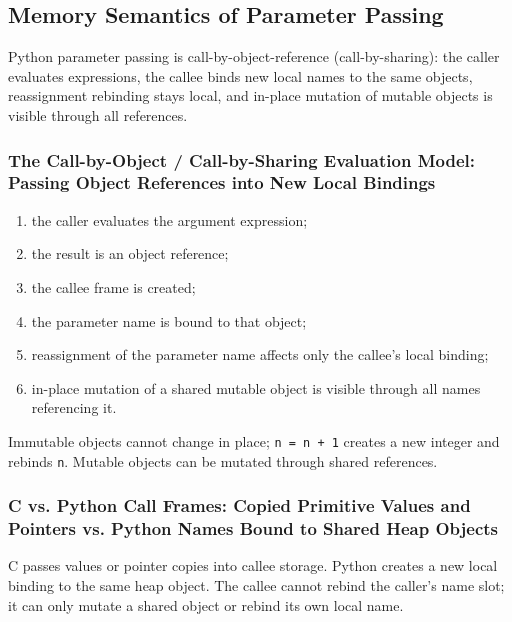 \subsection{Memory Semantics of Parameter Passing}

Python parameter passing is call-by-object-reference (call-by-sharing): the caller evaluates expressions, the callee binds new local names to the same objects, reassignment rebinding stays local, and in-place mutation of mutable objects is visible through all references.

\subsubsection{The Call-by-Object / Call-by-Sharing Evaluation Model: Passing Object References into New Local Bindings}

\begin{enumerate}
    \item the caller evaluates the argument expression;
    \item the result is an object reference;
    \item the callee frame is created;
    \item the parameter name is bound to that object;
    \item reassignment of the parameter name affects only the callee's local binding;
    \item in-place mutation of a shared mutable object is visible through all names referencing it.
\end{enumerate}



Immutable objects cannot change in place; \texttt{n = n + 1} creates a new integer and rebinds \texttt{n}. Mutable objects can be mutated through shared references.

\subsubsection{C vs. Python Call Frames: Copied Primitive Values and Pointers vs. Python Names Bound to Shared Heap Objects}

C passes values or pointer copies into callee storage. Python creates a new local binding to the same heap object. The callee cannot rebind the caller's name slot; it can only mutate a shared object or rebind its own local name.



